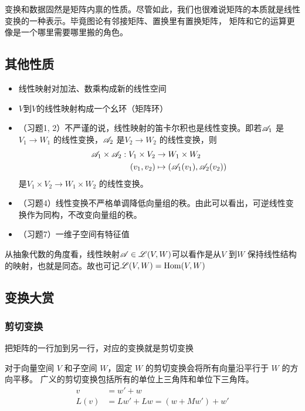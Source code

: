 变换和数据固然是矩阵内禀的性质。尽管如此，我们也很难说矩阵的本质就是线性变换的一种表示。毕竟图论有邻接矩阵、置换里有置换矩阵，
矩阵和它的运算更像是一个哪里需要哪里搬的角色。


\subsection{其他性质}
\begin{itemize}
    \item 线性映射对加法、数乘构成新的线性空间
    \item \(V\)到\(V\)的线性映射构成一个幺环（矩阵环）
    \item （习题1, 2）不严谨的说，线性映射的笛卡尔积也是线性变换。即若\(\mathscr{A}_{1}\)
        是\(V_{1} \to W_{1}\) 的线性变换，\(\mathscr{A}_{2}\)
        是\(V_{2} \to W_{2}\) 的线性变换，则
        \begin{align*}
            \mathscr{A}_{1} \times \mathscr{A}_{2} : V_{1}
            \times V_{2} &\to W_{1} \times W_{2}\\
            (v_{1},v_{2}) &\mapsto
            (\mathscr{A}_{1}(v_{1}),\mathscr{A}_{2}(v_{2}))
        \end{align*}
        是\(V_{1} \times V_{2} \to
        W_{1} \times W_{2}\) 的线性变换。
    \item （习题4）线性变换不严格单调降低向量组的秩。由此可以看出，可逆线性变换作为同构，不改变向量组的秩。
    \item （习题7）一维子空间有特征值
\end{itemize}

从抽象代数的角度看，线性映射\(\mathscr{A} \in \mathscr{L}(V,W)\)可以看作是从\(V\) 到\(W\)
保持线性结构的映射，也就是同态。故也可记\(\mathscr{L}(V,W)=\operatorname{Hom}(V,W)\)
\subsection{变换大赏}
\subsubsection{剪切变换}
把矩阵的一行加到另一行，对应的变换就是剪切变换

对于向量空间 \(V\) 和子空间 \(W\)，固定 \(W\) 的剪切变换会将所有向量沿平行于 \(W\) 的方向平移。
广义的剪切变换包括所有的单位上三角阵和单位下三角阵。
\begin{align*}
    v &= w' + w \\
    L(v) &= Lw'+Lw = (w + Mw') + w'
\end{align*}

